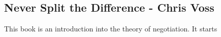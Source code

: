 \subsection{Never Split the Difference - Chris Voss}

This book is an introduction into the theory of negotiation. It starts
